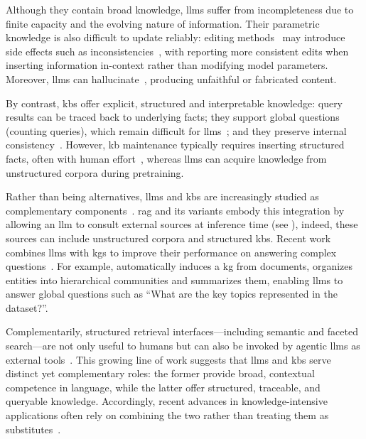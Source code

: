 Although they contain broad knowledge, \acp{llm} suffer from incompleteness due to finite capacity and the evolving nature of information. Their parametric knowledge is also difficult to update reliably: editing methods~\cite{yao-etal-2023-editing,kg_editing_survey_2024} may introduce side effects such as inconsistencies~\cite{li2024unveiling,cohen-etal-2024-rippleeffects}, with \textcite{cohen-etal-2024-rippleeffects} reporting more consistent edits when inserting information in-context rather than modifying model parameters. Moreover, \acp{llm} can hallucinate~\cite{ji_etal-2023-survey-hallucination}, producing unfaithful or fabricated content.

By contrast, \acp{kb} offer explicit, structured and interpretable knowledge: query results can be traced back to underlying facts; they support global questions (\eg counting queries), which remain difficult for \acp{llm}~\cite{physics_of_lm_3.1_2024}; and they preserve internal consistency~\cite{zheng2024reliablellmsknowledgebases}. However, \ac{kb} maintenance typically requires inserting structured facts, often with human effort~\cite{entityorientedsearch2018balog}, whereas \acp{llm} can acquire knowledge from unstructured corpora during pretraining.

Rather than being alternatives, \acp{llm} and \acp{kb} are increasingly studied as complementary components~\cite{kg_llm_roadmap_2024,peng2024graphretrievalaugmentedgenerationsurvey}. \Acf{rag} and its variants embody this integration by allowing an \ac{llm} to consult external sources at inference time (see ), indeed, these sources can include unstructured corpora and structured \acp{kb}. Recent work combines \acp{llm} with \acp{kg} to improve their performance on answering complex questions~\cite{edge2025localglobalgraphrag,hybridrag_kg_vector_rag_2024,Xu_2024_rag_kg}. For example, \textcite{edge2025localglobalgraphrag} automatically induces a \ac{kg} from documents, organizes entities into hierarchical communities and summarizes them, enabling \acp{llm} to answer global questions such as ``What are the key topics represented in the dataset?''. 

Complementarily, structured retrieval interfaces---including semantic and faceted search---are not only useful to humans but can also be invoked by agentic \acp{llm} as external tools~\cite{xi2025rise,plaat2025agenticlargelanguagemodels,schick2023toolformerlanguagemodelsteach,yao2023reactsynergizingreasoningacting,gao-etal-2025-efficient}. This growing line of work suggests that \acp{llm} and \acp{kb} serve distinct yet complementary roles: the former provide broad, contextual competence in language, while the latter offer structured, traceable, and queryable knowledge. Accordingly, recent advances in knowledge-intensive applications often rely on combining the two rather than treating them as substitutes~\cite{HAN2024121052legalasst,llm_kgs_medical_2025}.
